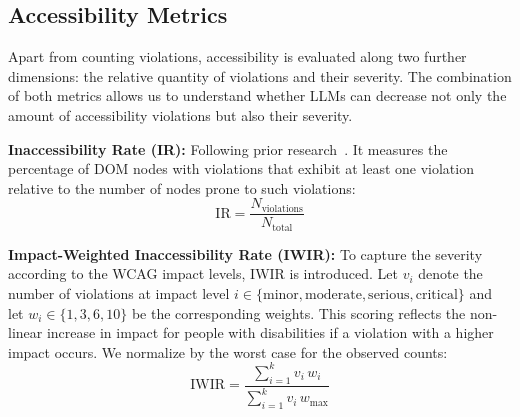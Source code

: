 \subsection{Accessibility Metrics}
Apart from counting violations, accessibility is evaluated along two
further dimensions: the relative quantity of violations and their 
severity. The combination of both metrics allows us to understand 
whether LLMs can decrease not only
the amount of accessibility violations but also their severity.\newline

\textbf{Inaccessibility Rate (IR):} Following prior
research~\parencite{alshayban2020accessibility}. It measures the 
percentage of DOM nodes with violations that exhibit at least one violation
relative to the number of nodes prone to such violations:
\begin{equation}
    \mathrm{IR} = \frac{N_{\mathrm{violations}}}{N_{\mathrm{total}}}
\end{equation}\newline

\textbf{Impact-Weighted Inaccessibility Rate (IWIR):}
To capture the severity according to the WCAG impact levels, IWIR
is introduced. Let $v_i$ denote the number of violations at impact 
level $i \in \{\text{minor}, \text{moderate}, \text{serious}, 
\text{critical}\}$ and let $w_i \in \{1,3,6,10\}$ be the corresponding 
weights. This scoring reflects the non-linear increase 
in impact for people with disabilities if a violation with a higher
impact occurs.
We normalize by the worst case for the observed counts:
\begin{equation}
  \mathrm{IWIR} = 
    \frac{\displaystyle\sum_{i=1}^{k} v_i \, w_i}
         {\displaystyle\sum_{i=1}^{k} v_i \, w_{\mathrm{max}}}
  \label{eq:iwir}
\end{equation}







